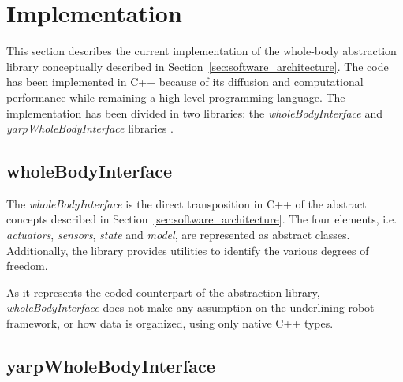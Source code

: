 \section{Implementation} %
\label{sec:software_implementation}




This section describes the current implementation of the whole-body abstraction library conceptually described in Section~\ref{sec:software_architecture}.
The code has been implemented in C++ because of its diffusion and computational performance while remaining a high-level programming language.
The implementation has been divided in two libraries: the \emph{wholeBodyInterface} \cite{wbi} and \emph{yarpWholeBodyInterface} libraries \cite{yarpWBI}.

\subsection{wholeBodyInterface} %
\label{sub:wholebodyinterface}
The \emph{wholeBodyInterface} is the direct transposition in C++ of the abstract concepts described in Section~\ref{sec:software_architecture}.
The four elements, i.e. \emph{actuators}, \emph{sensors}, \emph{state} and \emph{model}, are represented as abstract classes.
Additionally, the library provides utilities to identify the various degrees of freedom.

As it represents the coded counterpart of the abstraction library, \emph{wholeBodyInterface} does not make any assumption on the underlining robot framework, or how data is organized, using only native C++ types.


\subsection{yarpWholeBodyInterface} %
\label{sub:yarpwholebodyinterface}


